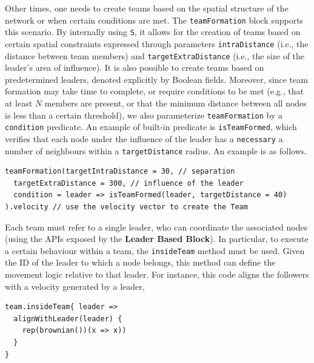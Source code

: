 Other times, one needs to create teams based on the spatial structure of the network or when certain conditions are met. 
%
The \lstinline|teamFormation| block supports this scenario. %
By internally using \lstinline|S|, 
 it allows for the creation of teams based on certain spatial constraints expressed through parameters \lstinline|intraDistance| (i.e., the distance between team members) 
 and \lstinline|targetExtraDistance| (i.e., the size of the leader's area of influence). 
%
It is also possible to create teams based on predetermined leaders, 
 denoted explicitly by Boolean fields. %
%
Moreover, since team formation may take time to complete, 
 or require conditions to be met (e.g., that at least $N$ members are present, or that the minimum distance between all nodes is less than a certain threshold),
 we also parameterize \lstinline|teamFormation| by a \lstinline|condition| predicate. 
%
An example of built-in predicate is \lstinline|isTeamFormed|, which verifies that each node under 
 the influence of the leader has a \lstinline|necessary| a number of neighbours
 within a \lstinline|targetDistance| radius.
%
An example is as follows.
\begin{lstlisting}
teamFormation(targetIntraDistance = 30, // separation
  targetExtraDistance = 300, // influence of the leader
  condition = leader => isTeamFormed(leader, targetDistance = 40)
).velocity // use the velocity vector to create the Team
\end{lstlisting}
Each team must refer to a single leader, 
 who can coordinate the associated nodes 
 (using the APIs exposed by the \textbf{Leader Based Block}). 
In particular, to execute a certain behaviour within a team, 
 the \lstinline|insideTeam| method must be used. 
 Given the ID of the leader to which a node belongs, 
 this method can define the movement logic relative to that leader.
%
For instance, this code aligns the followers with a velocity generated by a leader, 
\begin{lstlisting}[xrightmargin=-3.4pt]
team.insideTeam{ leader => 
  alignWithLeader(leader) {
    rep(brownian())(x => x))
  }
}
\end{lstlisting}
%

